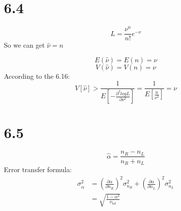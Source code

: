\documentclass{article}
\begin{document}
\begin{CJK*}{GBK}{song}
 \section{6.4}
 \begin{equation}
 L=\frac{\nu^n}{n!}e^{-\nu}
 \end{equation}
 So we can get $\hat{\nu}=n$
 
 \begin{equation}
 E(\hat{\nu})=E(n)=\nu
 \end{equation}
  \begin{equation}
 V(\hat{\nu})=V(n)=\nu
 \end{equation}
 According to the 6.16:
 \begin{equation}
 V[\hat{\nu}]>\frac{1}{E[-\frac{\partial^2logL}{\partial\nu^2}]}=\frac{1}{E[\frac{n}{\nu^2}]}=\nu
 \end{equation}
 
 
 \section{6.5}
 \begin{equation}
 \hat{\alpha}=\frac{n_R-n_L}{n_R+n_L}
 \end{equation}
 Error transfer formula:
 \begin{equation}
\begin{aligned}
\sigma^2_{\hat{\alpha}}&=(\frac{\partial\alpha}{\partial n_R})^2\sigma^2_{n_R}+(\frac{\partial\alpha}{\partial n_L})^2\sigma^2_{n_L}\\
&=\sqrt{\frac{1-\alpha^2}{\nu_{tot}}}
\end{aligned}
 \end{equation}
 

\end{CJK*}
\end{document}
